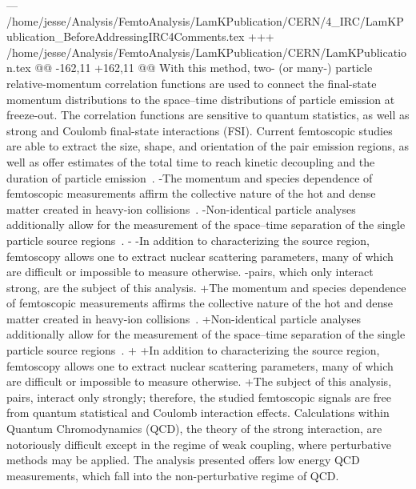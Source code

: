 --- /home/jesse/Analysis/FemtoAnalysis/LamKPublication/CERN/4_IRC/LamKPublication_BeforeAddressingIRC4Comments.tex
+++ /home/jesse/Analysis/FemtoAnalysis/LamKPublication/CERN/LamKPublication.tex
@@ -162,11 +162,11 @@
 With this method, two- (or many-) particle relative-momentum correlation functions are used to connect the final-state momentum distributions to the space--time distributions of particle emission at freeze-out.  
 The correlation functions are sensitive to quantum statistics, as well as strong and Coulomb final-state interactions (FSI).  
 Current femtoscopic studies are able to extract the size, shape, and orientation of the pair emission regions, as well as offer estimates of the total time to reach kinetic decoupling and the duration of particle emission~\cite{Lisa:2005dd, Lisa:2008gf}.
-The momentum and species dependence of femtoscopic measurements affirm the collective nature of the hot and dense matter created in heavy-ion collisions~\cite{Makhlin:1987gm, Akkelin:1995gh, Retiere:2003kf, Kisiel:2009eh}.
-Non-identical particle analyses additionally allow for the measurement of the space--time separation of the single particle source regions~\cite{Lednicky:1995vk, Voloshin:1997jh, Lednicky:2001qv, Retiere:2003kf}.
-
-In addition to characterizing the source region, femtoscopy allows one to extract nuclear scattering parameters, many of which are difficult or impossible to measure otherwise.  
-\LamK pairs, which only interact strong, are the subject of this analysis.
+The momentum and species dependence of femtoscopic measurements affirms the collective nature of the hot and dense matter created in heavy-ion collisions~\cite{Makhlin:1987gm, Akkelin:1995gh, Retiere:2003kf, Kisiel:2009eh}.
+Non-identical particle analyses additionally allow for the measurement of the space--time separation of the single particle source regions~\cite{Lednicky:1995vk, Voloshin:1997jh, Retiere:2003kf}.
+
+In addition to characterizing the source region, femtoscopy allows one to extract nuclear scattering parameters, many of which are difficult or impossible to measure otherwise.
+The subject of this analysis, \LamK pairs, interact only strongly; therefore, the studied femtoscopic signals are free from quantum statistical and Coulomb interaction effects.
 Calculations within Quantum Chromodynamics (QCD), the theory of the strong interaction, are notoriously difficult except in the regime of weak coupling, where perturbative methods may be applied. 
 The \LamK analysis presented offers low energy QCD measurements, which fall into the non-perturbative regime of QCD.
